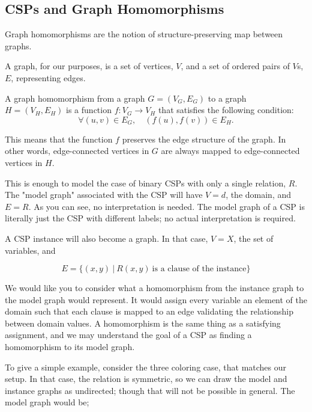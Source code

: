 \subsection{CSPs and Graph Homomorphisms}\label{sec:homomorphism}

Graph homomorphisms are the notion of structure-preserving map between graphs. 

\begin{definition}
A graph, for our purposes, is a set of vertices, $V$, and a set of ordered pairs of $V$s, $E$, representing edges.
\end{definition}

\begin{definition}
A graph homomorphism from a graph $G = (V_G, E_G)$ to a graph $H = (V_H, E_H)$ is a function $f: V_G \rightarrow V_H$ that satisfies the following condition:
\begin{equation}
    \forall (u, v) \in E_G, \quad (f(u), f(v)) \in E_H.    
\end{equation}    
\end{definition}

This means that the function $f$ preserves the edge structure of the graph. In other words, edge-connected vertices in $G$ are always mapped to edge-connected vertices in $H$.

This is enough to model the case of binary CSPs with only a single relation, $R$. The "model graph" associated with the CSP will have $V = d$, the domain, and $E = R$. As you can see, no interpretation is needed. The model graph of a CSP is literally just the CSP with different labels; no actual interpretation is required.

A CSP instance will also become a graph. In that case, $V = X$, the set of variables, and

\begin{equation}
    E = \{ (x, y)\ |\ R(x, y)\ \text{is a clause of the instance} \}
\end{equation}

We would like you to consider what a homomorphism from the instance graph to the model graph would represent. It would assign every variable an element of the domain such that each clause is mapped to an edge validating the relationship between domain values. A homomorphism is the same thing as a satisfying assignment, and we may understand the goal of a CSP as finding a homomorphism to its model graph.

To give a simple example, consider the three coloring case, that matches our setup. In that case, the relation is symmetric, so we can draw the model and instance graphs as undirected; though that will not be possible in general. The model graph would be;

